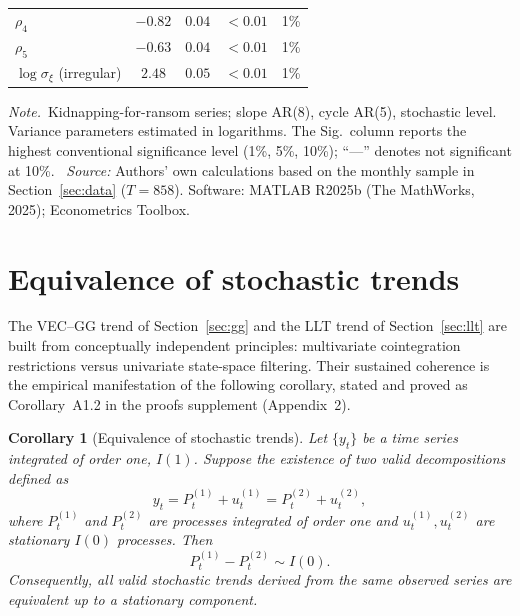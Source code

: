 \documentclass[12pt]{article}
\numberwithin{equation}{section}
\numberwithin{table}{section}
\newtheorem{corollary}[theorem]{Corollary}
\theoremstyle{definition}
\newcommand{\tabnote}{\par\addvspace{0.4em}\noindent\emph{Note.}}
\newcommand{\tabsource}{\ \textit{Source:} Authors' own calculations based on
the monthly sample in Section~\ref{sec:data} ($T=858$). Software: MATLAB
R2025b (The MathWorks, 2025); Econometrics Toolbox.}
\begin{document}
\begin{table}[t]
\begin{tabular}{lcccl}
$\rho_4$                       & $-0.82$ & $0.04$ & $<0.01$ & 1\% \\
$\rho_5$                       & $-0.63$ & $0.04$ & $<0.01$ & 1\% \\
$\log\sigma_\xi$ (irregular)   & $2.48$  & $0.05$ & $<0.01$ & 1\% \\
\bottomrule
\end{tabular}
\tabnote\ Kidnapping-for-ransom series; slope AR(8), cycle AR(5), stochastic
level. Variance parameters estimated in logarithms. The Sig.\ column reports
the highest conventional significance level (1\%, 5\%, 10\%); ``---'' denotes
not significant at 10\%.
\tabsource
\end{table}

\section{Equivalence of stochastic trends}
\label{sec:equivalence}

The VEC--GG trend of Section~\ref{sec:gg} and the LLT trend of
Section~\ref{sec:llt} are built from conceptually independent principles:
multivariate cointegration restrictions versus univariate state-space
filtering. Their sustained coherence is the empirical manifestation of the
following corollary, stated and proved as
Corollary~A1.2 in the proofs supplement (Appendix~2).

\begin{corollary}[Equivalence of stochastic trends]
\label{cor:equiv-trend}
Let $\{y_t\}$ be a time series integrated of order one, $I(1)$. Suppose the
existence of two valid decompositions defined as
\begin{equation*}
y_t = P_t^{(1)} + u_t^{(1)} = P_t^{(2)} + u_t^{(2)},
\end{equation*}
where $P_t^{(1)}$ and $P_t^{(2)}$ are processes integrated of order one and
$u_t^{(1)}, u_t^{(2)}$ are stationary $I(0)$ processes. Then
\begin{equation*}
P_t^{(1)} - P_t^{(2)} \sim I(0).
\end{equation*}
Consequently, all valid stochastic trends derived from the same observed
series are equivalent up to a stationary component.
\end{corollary}
\end{document}
